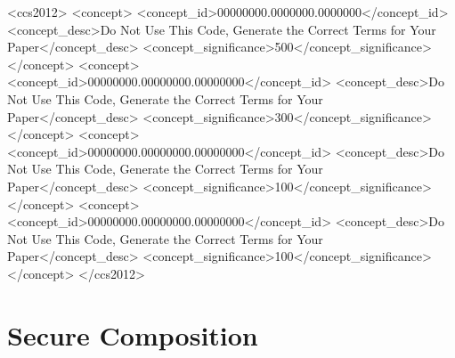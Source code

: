 \documentclass[acmsmall]{acmart}
\theoremstyle{definition}
\begin{document}
\begin{CCSXML}
<ccs2012>
 <concept>
  <concept_id>00000000.0000000.0000000</concept_id>
  <concept_desc>Do Not Use This Code, Generate the Correct Terms for Your Paper</concept_desc>
  <concept_significance>500</concept_significance>
 </concept>
 <concept>
  <concept_id>00000000.00000000.00000000</concept_id>
  <concept_desc>Do Not Use This Code, Generate the Correct Terms for Your Paper</concept_desc>
  <concept_significance>300</concept_significance>
 </concept>
 <concept>
  <concept_id>00000000.00000000.00000000</concept_id>
  <concept_desc>Do Not Use This Code, Generate the Correct Terms for Your Paper</concept_desc>
  <concept_significance>100</concept_significance>
 </concept>
 <concept>
  <concept_id>00000000.00000000.00000000</concept_id>
  <concept_desc>Do Not Use This Code, Generate the Correct Terms for Your Paper</concept_desc>
  <concept_significance>100</concept_significance>
 </concept>
</ccs2012>
\end{CCSXML}




\maketitle





\section{Secure Composition}\label{sec:sequential}
\end{document}
